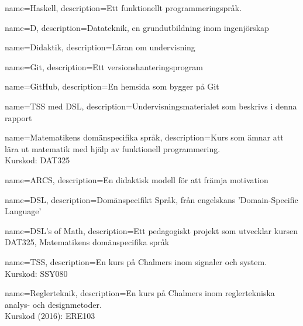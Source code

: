 
{
	name=Haskell,
	description={Ett funktionellt programmeringspråk.}
}

{
    name=D,
    description={Datateknik, en grundutbildning inom ingenjörskap}
}

{
    name=Didaktik,
    description={Läran om undervisning}
}

{
    name=Git,
    description={Ett versionshanteringsprogram}
}

{
    name=GitHub,
    description={En hemsida som bygger på Git}
}

{
    name={TSS med DSL},
    description={Undervisningsmaterialet som beskrivs i denna rapport}
}

{
    name={Matematikens domänspecifika språk},
    description={Kurs som ämnar att lära ut matematik med hjälp av funktionell programmering. \\
    Kurskod: DAT325}
}

{
    name=ARCS,
    description={En didaktisk modell för att främja motivation}
}

{
    name=DSL,
    description={Domänspecifikt Språk, från engelskans 'Domain-Specific Language'}
}

{
    name={DSL's of Math},
    description={Ett pedagogiskt projekt som utvecklar kursen DAT325, Matematikens domänspecifika språk}
}

{
    name={TSS},
    description={En kurs på Chalmers inom signaler och system. \\ Kurskod: SSY080}
}

{
    name={Reglerteknik},
    description={En kurs på Chalmers inom reglertekniska analys- och designmetoder.\\
    Kurskod (2016): ERE103}
}





